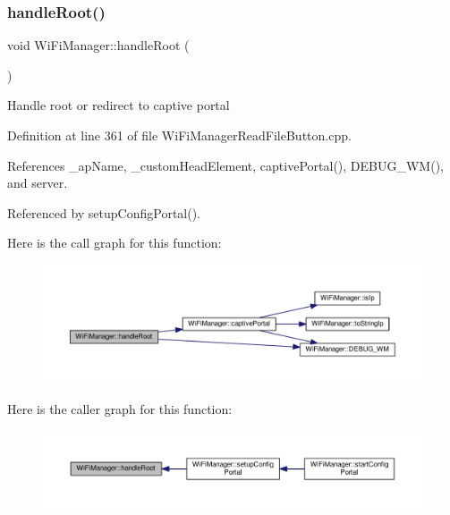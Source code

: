 \subsubsection{\texorpdfstring{handle\+Root()}{handleRoot()}}
{\footnotesize\ttfamily void Wi\+Fi\+Manager\+::handle\+Root (\begin{DoxyParamCaption}{ }\end{DoxyParamCaption})\hspace{0.3cm}{\ttfamily [private]}}

Handle root or redirect to captive portal 

Definition at line 361 of file Wi\+Fi\+Manager\+Read\+File\+Button.\+cpp.



References \+\_\+ap\+Name, \+\_\+custom\+Head\+Element, captive\+Portal(), D\+E\+B\+U\+G\+\_\+\+W\+M(), and server.



Referenced by setup\+Config\+Portal().

Here is the call graph for this function\+:\nopagebreak
\begin{figure}[H]
\begin{center}
\leavevmode
\includegraphics[width=350pt]{d4/dc8/class_wi_fi_manager_a47e4c7df7478f690c53ff9f5125c9760_cgraph}
\end{center}
\end{figure}
Here is the caller graph for this function\+:\nopagebreak
\begin{figure}[H]
\begin{center}
\leavevmode
\includegraphics[width=350pt]{d4/dc8/class_wi_fi_manager_a47e4c7df7478f690c53ff9f5125c9760_icgraph}
\end{center}
\end{figure}
\mbox{\label{class_wi_fi_manager_a57a9048175c1918340ab9d0a2c53601f}} 
